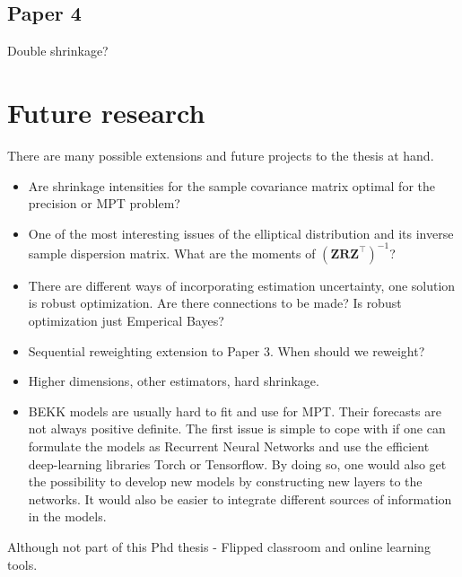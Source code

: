\documentclass[]{book}\usepackage{knitr}
\begin{document}
\section*{Paper 4}
Double shrinkage?
\chapter{Future research}\label{ch:future}

There are many possible extensions and future projects to the thesis at hand.

\begin{itemize}
	\item Are shrinkage intensities for the sample covariance matrix optimal for the precision or MPT problem? 
	\item One of the most interesting issues of the elliptical distribution and its inverse sample dispersion matrix. What are the moments of $(\mathbf{Z} \mathbf{R} \mathbf{Z}^\top)^{-1}$?
	\item There are different ways of incorporating estimation uncertainty, one solution is robust optimization. Are there connections to be made? Is robust optimization just Emperical Bayes?
	\item Sequential reweighting extension to Paper 3. When should we reweight?
	\item Higher dimensions, other estimators, hard shrinkage.
	\item BEKK models are usually hard to fit and use for MPT. Their forecasts are not always positive definite. The first issue is simple to cope with if one can formulate the models as Recurrent Neural Networks and use the efficient deep-learning libraries Torch or Tensorflow. By doing so, one would also get the possibility to develop new models by constructing new layers to the networks. It would also be easier to integrate different sources of information in the models.
\end{itemize}

Although not part of this Phd thesis - Flipped classroom and online learning tools.


\end{document}
